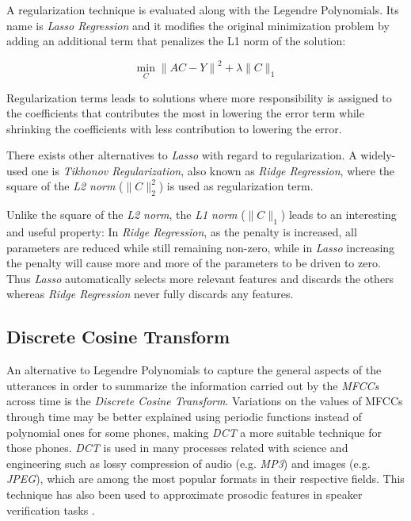 A regularization technique is evaluated along with the Legendre Polynomials. Its name is
\textit{Lasso Regression} and it modifies the
original minimization problem by adding an additional term that penalizes the L1 norm of the
solution:

\begin{equation}
  \min_{C} {\| AC - Y \|}^{2} + \lambda \| C \|_{1}
\end{equation}

Regularization terms leads to solutions where more responsibility is assigned to the
coefficients that contributes the most in lowering the error term while
shrinking the coefficients with less contribution to lowering the error.

There exists other alternatives to \textit{Lasso} with regard to regularization.
A widely-used one is \textit{Tikhonov Regularization}, also known as \textit{Ridge Regression},
where the square of the \textit{L2 norm} ($\| C \|_{2}^{2}$) is used as regularization term.

Unlike the square of the \textit{L2 norm},
the \textit{L1 norm} ($\| C \|_{1}$)
leads to an interesting and useful property:
In \textit{Ridge Regression}, as the penalty is increased, all parameters are reduced while
still remaining non-zero, while in \textit{Lasso} increasing the penalty will cause more and
more of the parameters to be driven to zero. Thus \textit{Lasso} automatically selects more
relevant features and discards the others whereas \textit{Ridge Regression} never fully
discards any features.


\subsection{Discrete Cosine Transform}

An alternative to Legendre Polynomials to capture the general aspects of the utterances in order to
summarize the information carried out by the \textit{MFCCs} across time is the
\textit{Discrete Cosine Transform}. Variations on the values of MFCCs through time may be
better explained
using periodic functions instead of polynomial ones for some phones,
making \textit{DCT} a more suitable technique
for those phones. \textit{DCT} is used in many processes related with science and engineering
such as lossy compression of audio (e.g. \textit{MP3}) and images (e.g. \textit{JPEG}), which are
among the most popular formats in their respective fields. This technique has also been used
to approximate prosodic features in speaker verification tasks \cite{dct}.

